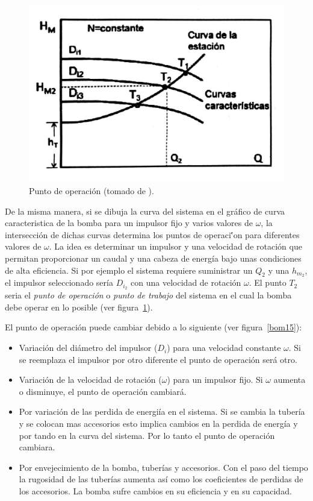 \documentclass[11pt, oneside]{article}
\begin{document}
\begin{figure}[h]
\centering
\includegraphics[width=12cm]{./figs/bom14.jpeg}
\caption{Punto de operaci\'on (tomado de \cite{agudelo2011mecanica}).} 
\label{bom14}
\end{figure}

De la misma manera, si se dibuja la curva del sistema en el gr\'afico de curva caracteristica de la bomba para un impulsor fijo y varios valores de $\omega$, la intersecci\'on de dichas curvas determina los puntos de  operaci\''on para diferentes valores de  $\omega$. La idea es determinar un impulsor y una velocidad de rotaci\'on que permitan proporcionar un caudal y una cabeza de energ\'ia bajo unas condiciones de alta eficiencia. Si por ejemplo el sistema requiere suministrar un  $Q_2$ y una $h_{m_2}$, el impulsor seleccionado ser\'ia $D_{i_2}$ con una velocidad de rotaci\'on $\omega$. El punto $T_2$ seria el \emph{punto de operaci\'on} o \emph{punto de trabajo} del sistema en el cual la bomba debe operar en lo posible (ver figura~\ref{bom14}). 

El punto de operaci\'on puede cambiar debido a lo siguiente (ver figura~\ref{bom15}):
\begin{itemize}
\item Variaci\'on del di\'ametro del impulsor ($D_i$) para una velocidad constante $\omega$. Si se reemplaza el impulsor por otro diferente el punto de operaci\'on ser\'a otro.
\item Variaci\'on de la velocidad de rotaci\'on ($\omega$) para un impulsor fijo. Si $\omega$ aumenta o disminuye, el punto de operaci\'on cambiar\'a. 
\item Por variaci\'on de las perdida de energi\'ia en el sistema. Si se cambia la tuber\'ia y se colocan mas accesorios esto implica cambios en la perdida de energ\'ia y por tando en la curva del sistema. Por lo tanto el punto de operaci\'on cambiara. 
\item Por envejecimiento de la bomba, tuber\'ias y accesorios. Con el paso del tiempo la rugosidad de las tuber\'ias aumenta as\'i como los coeficientes de perdidas de los accesorios. La bomba sufre cambios en su eficiencia y en su capacidad.  
\end{itemize}
\end{document}
